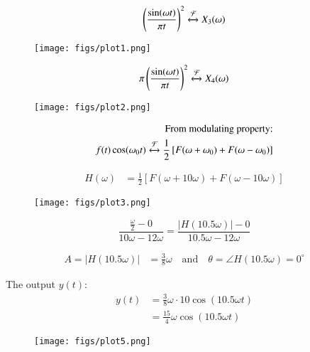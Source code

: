 \documentclass[journal,12pt,twocolumn]{IEEEtran}
\begin{document}
\begin{align}
\left(\frac{\sin(\omega t)}{\pi t}\right)^2  \xleftrightarrow{\mathcal{F}} X_3(\omega) 
\end{align}
\begin{figure}[h!]
    \centering
    \texttt{[image: figs/plot1.png]}
    \caption{}
    \label{fig:sr1}
\end{figure}
\begin{align}
\pi\left(\frac{\sin(\omega t)}{\pi t}\right)^2 \xleftrightarrow{\mathcal{F}} X_4(\omega)
\end{align}
\begin{figure}[h!]
    \centering
    \texttt{[image: figs/plot2.png]}
    \caption{}
    \label{fig:sr1}
\end{figure}
    \begin{align}
\text{From modulating property:} \nonumber \\
        f(t) \cos(\omega_0 t) \xleftrightarrow{\mathcal{F}} \frac{1}{2} \left[F(\omega + \omega_0) + F(\omega - \omega_0)\right]
    \end{align}

    \begin{align}
        H(\omega) &= \frac{1}{2} \left[F(\omega + 10\omega) + F(\omega - 10\omega)\right]
    \end{align}

\begin{figure}[h!]
    \centering
    \texttt{[image: figs/plot3.png]}
    \caption{}
    \label{fig:sr1}
\end{figure}
\begin{equation}
    \frac{\frac{\omega}{2} - 0}{10\omega - 12\omega} = \frac{|H(10.5\omega)| - 0}{10.5\omega - 12\omega}
\end{equation}

\begin{align}
A = |H(10.5\omega)| &= \frac{3}{8}\omega \quad \text{and} \quad  \theta= \angle H(10.5\omega) = 0^\circ
\end{align}

The output \(y(t)\):
\begin{align}
y(t) &= \frac{3}{8}\omega \cdot 10 \cos(10.5 \omega t) \\
&= \frac{15}{4}\omega \cos(10.5 \omega t)
\end{align}
\begin{figure}[h!]
    \centering
    \texttt{[image: figs/plot5.png]}
    \caption{}
    \label{fig:sr1}
\end{figure}
\end{document}
